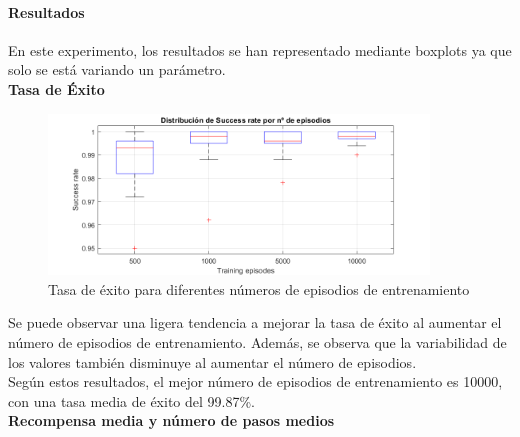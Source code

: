 \paragraph{Resultados}

En este experimento, los resultados se han representado mediante boxplots ya que solo se está variando un parámetro. 
\\

\newpage
\textbf{Tasa de Éxito}

\begin{figure}[H]
    \centering
    \includegraphics[width=0.9\textwidth]{../../experiments/qlearning/experiment-4/results/success.png}
    \caption{Tasa de éxito para diferentes números de episodios de entrenamiento}
    \label{fig:qlearning-success}
\end{figure}

 Se puede observar una ligera tendencia a mejorar la tasa de éxito al aumentar el número de episodios de entrenamiento. Además, se observa que la variabilidad de los valores también disminuye al aumentar el número de episodios.
\\

Según estos resultados, el mejor número de episodios de entrenamiento es 10000, con una tasa media de éxito del 99.87\%.
\\

\newpage
\textbf{Recompensa media y número de pasos medios}


